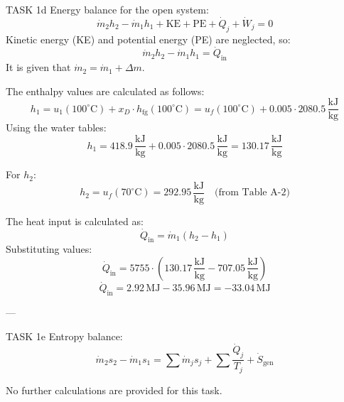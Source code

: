 TASK 1d  
Energy balance for the open system:  
\[
\dot{m}_2 h_2 - \dot{m}_1 h_1 + \text{KE} + \text{PE} + \dot{Q}_j + \dot{W}_j = 0
\]  
Kinetic energy (KE) and potential energy (PE) are neglected, so:  
\[
\dot{m}_2 h_2 - \dot{m}_1 h_1 = \dot{Q}_{\text{in}}
\]  
It is given that \( \dot{m}_2 = \dot{m}_1 + \Delta m \).  

The enthalpy values are calculated as follows:  
\[
h_1 = u_1(100^\circ\text{C}) + x_D \cdot h_{\text{fg}}(100^\circ\text{C}) = u_f(100^\circ\text{C}) + 0.005 \cdot 2080.5 \, \frac{\text{kJ}}{\text{kg}}
\]  
Using the water tables:  
\[
h_1 = 418.9 \, \frac{\text{kJ}}{\text{kg}} + 0.005 \cdot 2080.5 \, \frac{\text{kJ}}{\text{kg}} = 130.17 \, \frac{\text{kJ}}{\text{kg}}
\]  

For \( h_2 \):  
\[
h_2 = u_f(70^\circ\text{C}) = 292.95 \, \frac{\text{kJ}}{\text{kg}} \quad \text{(from Table A-2)}
\]  

The heat input is calculated as:  
\[
\dot{Q}_{\text{in}} = \dot{m}_1 (h_2 - h_1)
\]  
Substituting values:  
\[
\dot{Q}_{\text{in}} = 5755 \cdot (130.17 \, \frac{\text{kJ}}{\text{kg}} - 707.05 \, \frac{\text{kJ}}{\text{kg}})
\]  
\[
\dot{Q}_{\text{in}} = 2.92 \, \text{MJ} - 35.96 \, \text{MJ} = -33.04 \, \text{MJ}
\]  

---

TASK 1e  
Entropy balance:  
\[
\dot{m}_2 s_2 - \dot{m}_1 s_1 = \sum \dot{m}_j s_j + \sum \frac{\dot{Q}_j}{T_j} + \dot{S}_{\text{gen}}
\]  

No further calculations are provided for this task.  

